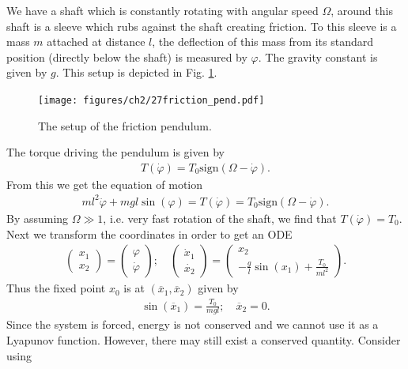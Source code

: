  \begin{ex}
	 We have a shaft which is constantly rotating with angular speed $\Omega $, around this shaft is a sleeve which rubs against the shaft creating friction. To this sleeve is a mass $m$ attached at distance $l$, the deflection of this mass from its standard position (directly below the shaft) is measured by $\varphi$. The gravity constant is given by $g$. This setup is depicted in Fig. \ref{fig:friction_pend}.
\begin{figure}[h!]
	\centering
	\texttt{[image: figures/ch2/27friction\_pend.pdf]}
	\caption{The setup of the friction pendulum.}
	\label{fig:friction_pend}
\end{figure}
The torque driving the pendulum is given by 
\begin{align}
	T(\dot{\varphi}) = T_0  \textrm{sign}(\Omega - \dot{\varphi}).
\end{align}
From this we get the equation of motion
\begin{align}
	ml^2 \ddot{\varphi} + mgl \sin(\varphi) = T(\dot{\varphi}) = T_0  \textrm{sign} (\Omega - \dot{\varphi}).
\end{align}
By assuming $\Omega \gg 1$, i.e. very fast rotation of the shaft, we find that $T(\dot{\varphi}) = T_0$. Next we transform the coordinates in order to get an ODE
\begin{align}
	\begin{pmatrix}
		x_1 \\ x_2
	\end{pmatrix}
	=
	\begin{pmatrix}
		\varphi \\ \dot{\varphi}
	\end{pmatrix}
	;\quad
	\begin{pmatrix}
		\dot{x}_1 \\ \dot{x_2}
	\end{pmatrix}
=
\begin{pmatrix}
	x_2 \\ - \frac{g}{l} \sin(x_1) + \frac{T_0}{ml^2}
\end{pmatrix}
.
\end{align}
Thus the fixed point $x_0$ is at $(\overline{x}_1, \overline{x}_2)$ given by 
\begin{align}
	\sin(\overline{x}_1) = \frac{T_0}{mgl};\quad \overline{x}_2=0.
\end{align}
Since the system is forced, energy is not conserved and we cannot use it as a Lyapunov function. However, there may still exist a conserved quantity. Consider using

\end{ex}

